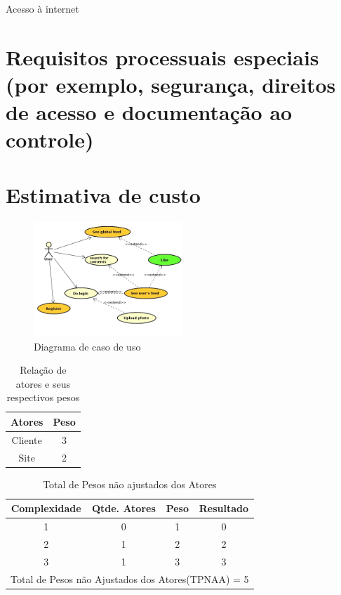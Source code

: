 Acesso à internet

\section{Requisitos processuais especiais (por exemplo, segurança, direitos de acesso e documentação ao controle)}

\pagebreak

\section{Estimativa de custo}

\begin{figure}[ht]
	\centering
	\includegraphics[width=0.5\textwidth]{./imagens/usecase.jpg}
	\caption{Diagrama de caso de uso}
	\label{fig:casoDeUso}
\end{figure}

\begin{table}[!htb]
	\caption[Atores]{Relação de atores e seus respectivos pesos}
	\label{tab:correlacao}
	\centering
	\begin{tabular}{c|c}
		Atores  & Peso 	\\ \hline
		Cliente & 3    	\\
		Site    & 2		\\
	\end{tabular}
\end{table}

\begin{table}[!htb]
	\caption[TPNAA]{Total de Pesos não ajustados dos Atores}
	\label{tab:correlacao}
	\centering
	\begin{tabular}{c|c|c|c}
		Complexidade 		 & Qtde. Atores 			& Peso 		 & Resultado	\\ \hline
		1 					 & 0						&	1		 &	  0 	 	\\
		2 					 & 1						&	2		 &	  2 	 	\\
		3 					 & 1						&	3		 &	  3 	 	\\ \hline
		\multicolumn{4}{l}{Total de Pesos não Ajustados dos Atores(TPNAA) = 5}	 	\\
	\end{tabular}
\end{table}

